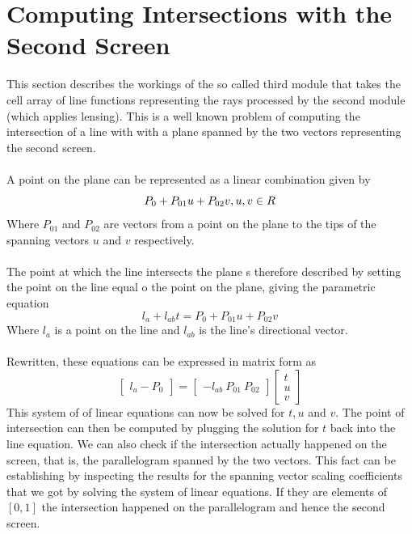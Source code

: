 \documentclass[A4]{article}
\begin{document}
\vspace{10mm}

\section{Computing Intersections with the Second Screen}

This section describes the workings of the so called third module that takes the cell array of line functions representing the rays processed by the second module (which applies lensing). This is a well known problem of computing the intersection of a line with with a plane spanned by the two vectors representing the second screen. \\\\
A point on the plane can be represented as a linear combination given by
\[
P_{0} + P_{01}u + P_{02}v, \\ u, v \in R
\]
Where $P_{01}$ and $P_{02}$ are vectors from a point on the plane to the tips of the spanning vectors $u$ and $v$ respectively. \\\\
The point at which the line intersects the plane s therefore described by setting the point on the line equal o the point on the plane, giving the parametric equation
\[
l_{a} + l_{ab}t = P_{0} + P_{01}u + P_{02}v
\]
Where $l_{a}$ is a point on the line and $l_{ab}$ is the line's directional vector. \\\\
Rewritten, these equations can be expressed in matrix form as
\[
\begin{bmatrix} l_{a} - P_{0}\end{bmatrix} = \begin{bmatrix} -l_{ab} \ P_{01} \ P_{02}\end{bmatrix} \begin{bmatrix} t \\ u \\ v \end{bmatrix}
\]
This system of of linear equations can now be solved for $t, u$ and $v$. The point of intersection can then be computed by plugging the solution for $t$ back into the line equation. We can also check if the intersection actually happened on the screen, that is, the parallelogram spanned by the two vectors. This fact can be establishing by inspecting the results for the spanning vector scaling coefficients that we got by solving the system of linear equations. If they are elements of $[0, 1]$ the intersection happened on the parallelogram and hence the second screen. \\\\
\end{document}
